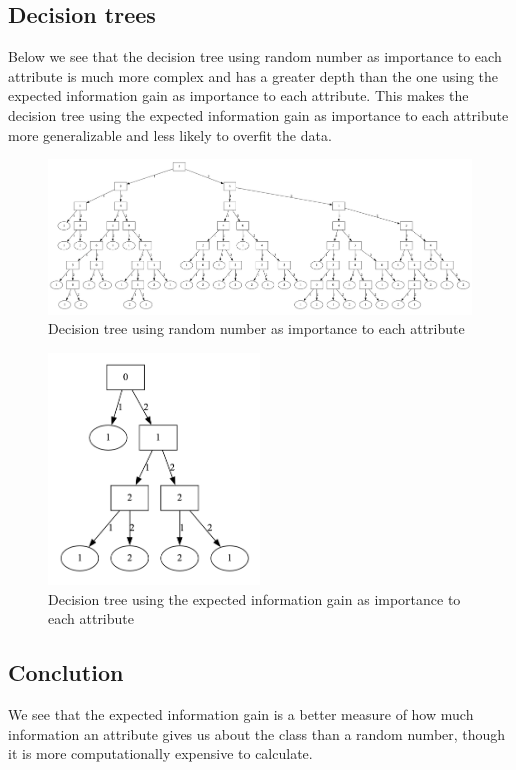 \documentclass{article}
\begin{document}
\subsection*{Decision trees}

Below we see that the decision tree using random number as importance to each attribute is much more complex and has a greater depth than the one using the expected information gain as importance to each attribute.
This makes the decision tree using the expected information gain as importance to each attribute more generalizable and less likely to overfit the data.

\begin{figure}[t]
    \centering
    \includegraphics[width=\linewidth]{random.png}
    \caption{Decision tree using random number as importance to each attribute}
    \label{fig:image2}
\end{figure}

\begin{figure}[t]
    \centering
    \includegraphics[width=0.5\textwidth]{information_gain.png}
    \caption{Decision tree using the expected information gain as importance to each attribute}
    \label{fig:image3}
\end{figure}

\subsection*{Conclution}

We see that the expected information gain is a better measure of how much information an attribute gives us about the class than a random number, though it is more computationally expensive to calculate.
\end{document}
